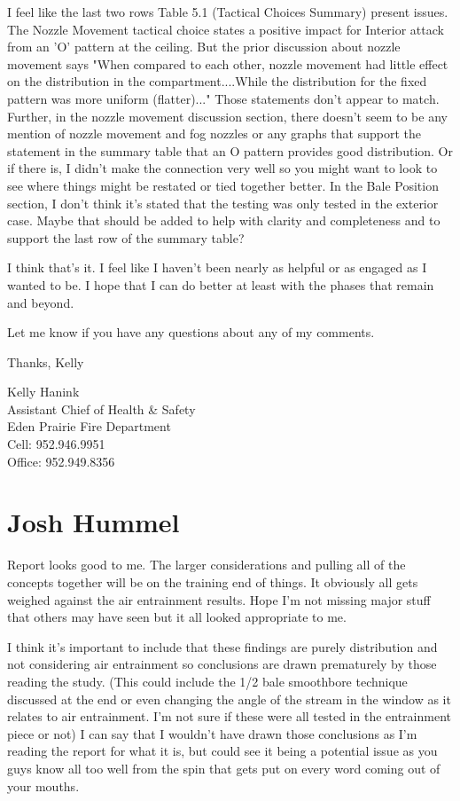 \documentclass[12pt,oneside]{book}
\begin{document}
\begin{appendix}
I feel like the last two rows Table 5.1 (Tactical Choices Summary) present issues.  The Nozzle Movement tactical choice states a positive impact for Interior attack from an 'O' pattern at the ceiling.  But the prior discussion about nozzle movement says "When compared to each other, nozzle movement had little effect on the distribution in the compartment....While the distribution for the fixed pattern was more uniform (flatter)..."  Those statements don't appear to match.  Further, in the nozzle movement discussion section, there doesn't seem to be any mention of nozzle movement and fog nozzles or any graphs that support the statement in the summary table that an O pattern provides good distribution.  Or if there is, I didn't make the connection very well so you might want to look to see where things might be restated or tied together better.  In the Bale Position section, I don't think it's stated that the testing was only tested in the exterior case.  Maybe that should be added to help with clarity and completeness and to support the last row of the summary table?  
 
I think that's it.  I feel like I haven't been nearly as helpful or as engaged as I wanted to be.  I hope that I can do better at least with the phases that remain and beyond.
 
Let me know if you have any questions about any of my comments.
 
Thanks,
Kelly
 
 
Kelly Hanink \\
Assistant Chief of Health \& Safety \\
Eden Prairie Fire Department \\

Cell: 952.946.9951 \\
Office: 952.949.8356 \\

\section{Josh Hummel}

Report looks good to me.  The larger considerations and pulling all of the concepts together will be on the training end of things.  It obviously all gets weighed against the air entrainment results.  Hope I'm not missing major stuff that others may have seen but it all looked appropriate to me. 
 
I think it's important to include that these findings are purely distribution and not considering air entrainment so conclusions are drawn prematurely by those reading the study.  (This could include the 1/2 bale smoothbore technique discussed at the end or even changing the angle of the stream in the window as it relates to air entrainment.  I'm not sure if these were all tested in the entrainment piece or not)  I can say that I wouldn't have drawn those conclusions as I'm reading the report for what it is, but could see it being a potential issue as you guys know all too well from the spin that gets put on every word coming out of your mouths.
 

\end{appendix}
\end{document}
